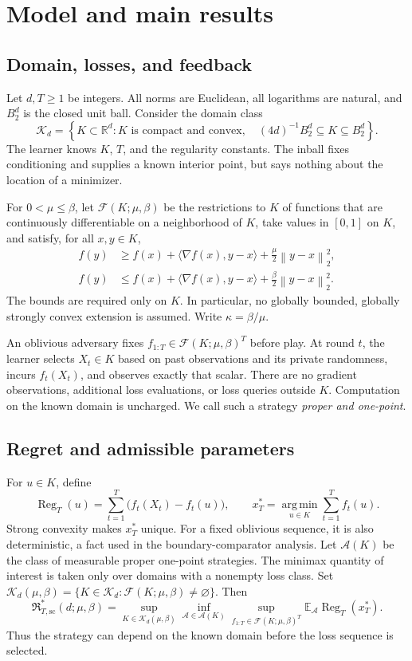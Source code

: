 \documentclass[11pt]{article}
\numberwithin{equation}{section}
\newcommand{\R}{\mathbb R}
\newcommand{\E}{\mathbb E}
\newcommand{\Reg}{\operatorname{Reg}}
\newcommand{\ip}[2]{\langle #1,#2\rangle}
\newcommand{\norm}[1]{\left\|#1\right\|}
\newcommand{\cK}{\mathcal K}
\newcommand{\cF}{\mathcal F}
\newcommand{\cA}{\mathcal A}
\newcommand{\argmin}{\operatorname*{arg\,min}}
\theoremstyle{definition}
\theoremstyle{remark}
\begin{document}
\section{Model and main results}\label{sec:model}
\subsection{Domain, losses, and feedback}
Let $d,T\geq1$ be integers. All norms are Euclidean, all logarithms are natural,
and $B_2^d$ is the closed unit ball. Consider the domain class
\begin{equation}\label{eq:domain}
 \cK_d=\left\{K\subset\R^d:K\text{ is compact and convex},\quad
                 (4d)^{-1}B_2^d\subseteq K\subseteq B_2^d\right\}.
\end{equation}
The learner knows $K$, $T$, and the regularity constants. The inball fixes
conditioning and supplies a known interior point, but says nothing about the
location of a minimizer.

For $0<\mu\leq\beta$, let $\cF(K;\mu,\beta)$ be the restrictions to $K$ of
functions that are continuously differentiable on a neighborhood of $K$, take
values in $[0,1]$ on $K$, and satisfy, for all $x,y\in K$,
\begin{align}
 f(y)&\geq f(x)+\ip{\nabla f(x)}{y-x}
                   +\frac\mu2\norm{y-x}_2^2,\label{eq:sc}\\
 f(y)&\leq f(x)+\ip{\nabla f(x)}{y-x}
                   +\frac\beta2\norm{y-x}_2^2.\label{eq:sm}
\end{align}
The bounds are required only on $K$. In particular, no globally bounded,
globally strongly convex extension is assumed. Write $\kappa=\beta/\mu$.

An oblivious adversary fixes $f_{1:T}\in\cF(K;\mu,\beta)^T$ before play. At
round $t$, the learner selects $X_t\in K$ based on past observations and its
private randomness, incurs $f_t(X_t)$, and observes exactly that scalar. There
are no gradient observations, additional loss evaluations, or loss queries
outside $K$. Computation on the known domain is uncharged. We call such a
strategy \emph{proper and one-point}.

\subsection{Regret and admissible parameters}
For $u\in K$, define
\[
 \Reg_T(u)=\sum_{t=1}^T\bigl(f_t(X_t)-f_t(u)\bigr),\qquad
 x_T^*=\argmin_{u\in K}\sum_{t=1}^Tf_t(u).
\]
Strong convexity makes $x_T^*$ unique. For a fixed oblivious sequence, it is
also deterministic, a fact used in the boundary-comparator analysis. Let
$\cA(K)$ be the class of measurable proper one-point strategies. The minimax
quantity of interest is taken only over domains with a nonempty loss class.
Set $\cK_d(\mu,\beta)=\{K\in\cK_d:\cF(K;\mu,\beta)\neq\varnothing\}$. Then
\begin{equation}\label{eq:minimax}
 \mathfrak R^*_{T,\mathrm{sc}}(d;\mu,\beta)
 =\sup_{K\in\cK_d(\mu,\beta)}\inf_{\mathcal A\in\cA(K)}
   \sup_{f_{1:T}\in\cF(K;\mu,\beta)^T}
      \E_{\mathcal A}\Reg_T(x_T^*).
\end{equation}
Thus the strategy can depend on the known domain before the loss sequence is
selected.
\end{document}
